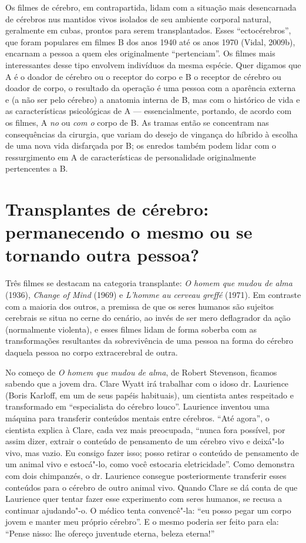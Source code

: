 Os filmes de cérebro, em contrapartida, lidam com a situação mais
desencarnada de cérebros nus mantidos vivos isolados de seu ambiente
corporal natural, geralmente em cubas, prontos para serem
transplantados. Esses ``ectocérebros'', que foram populares em filmes B
dos anos 1940 até os anos 1970 (Vidal, 2009b), encarnam a pessoa a quem
eles originalmente ``pertenciam''. Os filmes mais interessantes desse
tipo envolvem indivíduos da mesma espécie. Quer digamos que A é o doador
de cérebro ou o receptor do corpo e B o receptor de cérebro ou doador de
corpo, o resultado da operação é uma pessoa com a aparência externa e (a
não ser pelo cérebro) a anatomia interna de B, mas com o histórico de
vida e as características psicológicas de A --- essencialmente,
portando, de acordo com os filmes, A \emph{no} ou \emph{com o} corpo de
B. As tramas então se concentram nas consequências da cirurgia, que
variam do desejo de vingança do híbrido à escolha de uma nova vida
disfarçada por B; os enredos também podem lidar com o ressurgimento em A
de características de personalidade originalmente pertencentes a B.

\section{Transplantes de cérebro: permanecendo o mesmo ou se tornando outra
pessoa?}

Três filmes se destacam na categoria transplante: \emph{O homem que
mudou de alma} (1936), \emph{Change of Mind} (1969) e \emph{L'homme au
cerveau greffé} (1971). Em contraste com a maioria dos outros, a
premissa de que os seres humanos são sujeitos cerebrais se situa no
cerne do cenário, ao invés de ser mero deflagrador da ação (normalmente
violenta), e esses filmes lidam de forma soberba com as transformações
resultantes da sobrevivência de uma pessoa na forma do cérebro daquela
pessoa no corpo extracerebral de outra.

No começo de \emph{O homem que mudou de alma}, de Robert Stevenson,
ficamos sabendo que a jovem dra. Clare Wyatt irá trabalhar com o idoso
dr. Laurience (Boris Karloff, em um de seus papéis habituais), um
cientista antes respeitado e transformado em ``especialista do cérebro
louco''. Laurience inventou uma máquina para transferir conteúdos
mentais entre cérebros. ``Até agora'', o cientista explica à Clare, cada
vez mais preocupada, ``nunca fora possível, por assim dizer, extrair o
conteúdo de pensamento de um cérebro vivo e deixá"-lo vivo, mas vazio. Eu
consigo fazer isso; posso retirar o conteúdo de pensamento de um animal
vivo e estocá"-lo, como você estocaria eletricidade''. Como demonstra com
dois chimpanzés, o dr. Laurience consegue posteriormente transferir
esses conteúdos para o cérebro de outro animal vivo. Quando Clare se dá
conta de que Laurience quer tentar fazer esse experimento com seres
humanos, se recusa a continuar ajudando"-o. O médico tenta convencê"-la:
``eu posso pegar um corpo jovem e manter meu próprio cérebro''. E o
mesmo poderia ser feito para ela: ``Pense nisso: lhe ofereço juventude
eterna, beleza eterna!''

